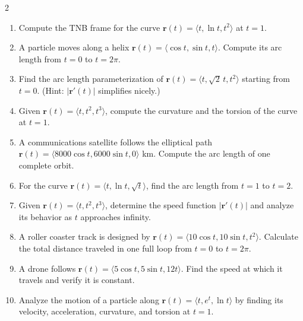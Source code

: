 \begin{multicols}{2}
\begin{enumerate}
    \item Compute the TNB frame for the curve \( \mathbf{r}(t) = \langle t, \ln t, t^2 \rangle \) at \( t = 1 \).
    \item A particle moves along a helix \( \mathbf{r}(t) = \langle \cos t, \sin t, t \rangle \). Compute its arc length from \( t = 0 \) to \( t = 2\pi \).
    \item Find the arc length parameterization of \( \mathbf{r}(t) = \langle t, \sqrt{2}\,t, t^2 \rangle \) starting from \( t = 0 \). (Hint: \( |\mathbf{r}'(t)| \) simplifies nicely.)
    \item Given \( \mathbf{r}(t) = \langle t, t^2, t^3 \rangle \), compute the curvature and the torsion of the curve at \( t = 1 \).
    \item A communications satellite follows the elliptical path \( \mathbf{r}(t) = \langle 8000\cos t, 6000\sin t, 0 \rangle \) km. Compute the arc length of one complete orbit.
    \item For the curve \( \mathbf{r}(t) = \langle t, \ln t, \sqrt{t} \rangle \), find the arc length from \( t = 1 \) to \( t = 2 \).
    \item Given \( \mathbf{r}(t) = \langle t, t^2, t^3 \rangle \), determine the speed function \( |\mathbf{r}'(t)| \) and analyze its behavior as \( t \) approaches infinity.
    \item A roller coaster track is designed by \( \mathbf{r}(t) = \langle 10\cos t, 10\sin t, t^2 \rangle \). Calculate the total distance traveled in one full loop from \( t = 0 \) to \( t = 2\pi \).
    \item A drone follows \( \mathbf{r}(t) = \langle 5\cos t, 5\sin t, 12t \rangle \). Find the speed at which it travels and verify it is constant.
    \item Analyze the motion of a particle along \( \mathbf{r}(t) = \langle t, e^t, \ln t \rangle \) by finding its velocity, acceleration, curvature, and torsion at \( t = 1 \).

\end{enumerate}

\end{multicols}


